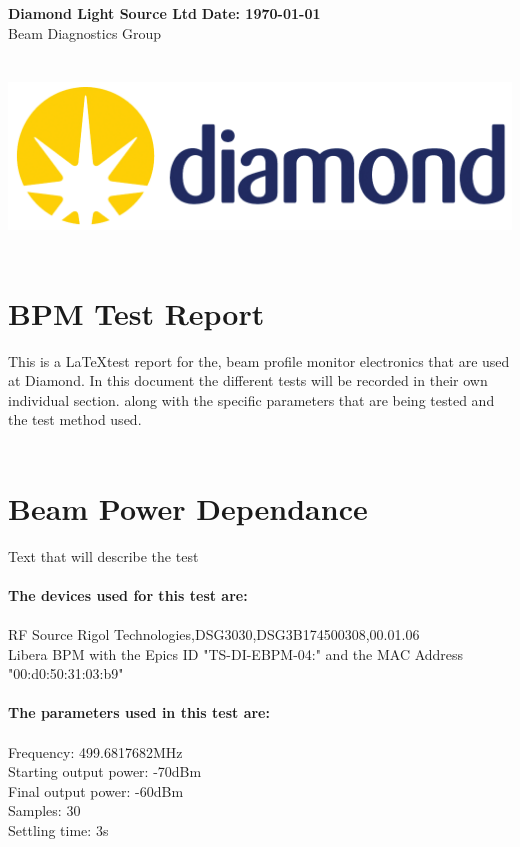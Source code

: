 \documentclass[a4paper, 11pt]{article}%
\begin{document}
%
\normalsize%
\noindent%
\large\textbf{Diamond Light Source Ltd} \hfill\large\textbf{Date: \today}%
\\\normalsize Beam Diagnostics Group \hfill\\%
\\\\\includegraphics[width = 1\textwidth]{./Latex_Report/Logo.PNG}\\\\%
\section*{BPM Test Report}%
This is a \LaTeX test report for the, beam profile monitor electronics that are used at Diamond. In this document the different tests will be recorded in their own individual section. along with the specific parameters that are being tested and the test method used.\\\\%
\clearpage%
\tableofcontents%
\listoffigures%
\clearpage%
\section{Beam Power Dependance}%
Text that will describe the test\\\\%
\textbf{The devices used for this test are:}\\\\%
RF Source Rigol Technologies,DSG3030,DSG3B174500308,00.01.06\\%
Libera BPM with the Epics ID "TS-DI-EBPM-04:" and the MAC Address "00:d0:50:31:03:b9"\\%
\\%
\textbf{The parameters used in this test are:}\\\\%
Frequency: 499.6817682MHz\\%
Starting output power: -70dBm\\%
Final output power: -60dBm\\%
Samples: 30\\%
Settling time: 3s\\
\end{document}
